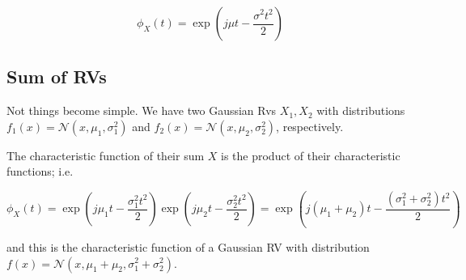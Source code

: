 \[
\phi_X(t) = \exp \left( j\mu t - \frac{\sigma^2 t^2}{2}\right)
\]

\subsection{Sum of RVs}

Not things become simple. We have two Gaussian Rvs \(X_1, X_2\) with
distributions \(f_1(x) = \mathcal{N}(x, \mu_1, \sigma_1^2)\) and
\(f_2(x) = \mathcal{N}(x, \mu_2, \sigma_2^2)\), respectively.

The characteristic function of their sum \(X\) is the product of their
characteristic functions; i.e.

\[
\phi_X(t) = \exp \left( j\mu_1 t - \frac{\sigma_1^2 t^2}{2}\right) \exp \left( j\mu_2 t - \frac{\sigma_2^2 t^2}{2}\right) = \exp \left( j(\mu_1 + \mu_2) t - \frac{(\sigma_1^2 + \sigma_2^2) t^2}{2}\right)
\]

and this is the characteristic function of a Gaussian RV with
distribution
\(f(x) = \mathcal{N}(x, \mu_1 + \mu_2, \sigma_1^2 + \sigma_2^2)\).
